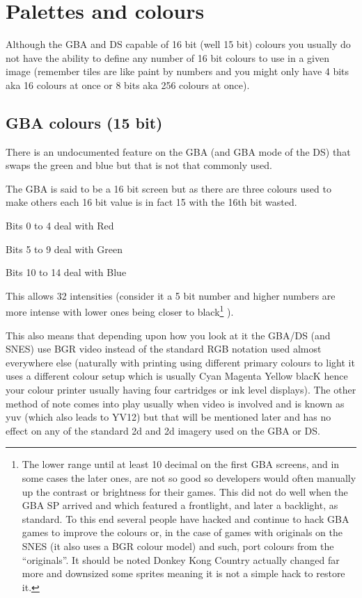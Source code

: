 \documentclass[
]{book}
\begin{document}
\hypertarget{palettes-and-colours}{%
\section{Palettes and colours}\label{palettes-and-colours}}

Although the GBA and DS capable of 16 bit (well 15 bit) colours you usually do not have the ability to define any number of 16 bit colours to use in a given image (remember tiles are like paint by numbers and you might only have 4 bits aka 16 colours at once or 8 bits aka 256 colours at once).

\hypertarget{gba-colours-15-bit}{%
\subsection{GBA colours (15 bit)}\label{gba-colours-15-bit}}

There is an undocumented feature on the GBA (and GBA mode of the DS) that swaps the green and blue but that is not that commonly used.

The GBA is said to be a 16 bit screen but as there are three colours used to make others each 16 bit value is in fact 15 with the 16th bit wasted.

Bits 0 to 4 deal with Red

Bits 5 to 9 deal with Green

Bits 10 to 14 deal with Blue

This allows 32 intensities (consider it a 5 bit number and higher numbers are more intense with lower ones being closer to black\footnote{The lower range until at least 10 decimal on the first GBA screens, and in some cases the later ones, are not so good so developers would often manually up the contrast or brightness for their games. This did not do well when the GBA SP arrived and which featured a frontlight, and later a backlight, as standard. To this end several people have hacked and continue to hack GBA games to improve the colours or, in the case of games with originals on the SNES (it also uses a BGR colour model) and such, port colours from the ``originals''. It should be noted Donkey Kong Country actually changed far more and downsized some sprites meaning it is not a simple hack to restore it.} ).

This also means that depending upon how you look at it the GBA/DS (and SNES) use BGR video instead of the standard RGB notation used almost everywhere else (naturally with printing using different primary colours to light it uses a different colour setup which is usually Cyan Magenta Yellow blacK hence your colour printer usually having four cartridges or ink level displays). The other method of note comes into play usually when video is involved and is known as yuv (which also leads to YV12) but that will be mentioned later and has no effect on any of the standard 2d and 2d imagery used on the GBA or DS.
\end{document}

